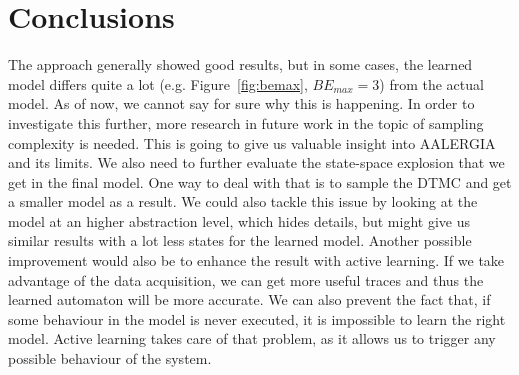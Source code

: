 \documentclass[
a4paper,
12pt
]{scrartcl}
\begin{document}
\section{Conclusions}
The approach generally showed good results, but in some cases, the learned model differs quite a lot (e.g. Figure~\ref{fig:bemax}, $BE_{max}=3$) from the actual model. As of now, we cannot say for sure why this is happening. In order to investigate this further, more research in future work in the topic of sampling complexity is needed. This is going to give us valuable insight into AALERGIA and its limits. We also need to further evaluate the state-space explosion that we get in the final model. One way to deal with that is to sample the DTMC and get a smaller model as a result. We could also tackle this issue by looking at the model at an higher abstraction level, which hides details, but might give us similar results with a lot less states for the learned model. Another possible improvement would also be to enhance the result with active learning. If we take advantage of the data acquisition, we can get more useful traces and thus the learned automaton will be more accurate. We can also prevent the fact that, if some behaviour in the model is never executed, it is impossible to learn the right model. Active learning takes care of that problem, as it allows us to trigger any possible behaviour of the system.

\appendix
 
 
\end{document}
